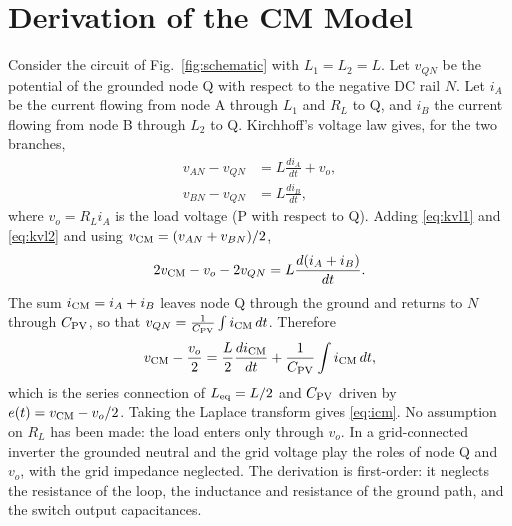 \section{Derivation of the CM Model}
\label{app:cm}
Consider the circuit of Fig.~\ref{fig:schematic} with $L_1=L_2=L$. Let $v_{QN}$ be the potential of the grounded node Q with respect to the negative DC rail $N$. Let $i_A$ be the current flowing from node A through $L_1$ and $R_L$ to Q, and $i_B$ the current flowing from node B through $L_2$ to Q. Kirchhoff's voltage law gives, for the two branches,
\begin{align}
v_{AN}-v_{QN}&=L\frac{di_A}{dt}+v_o, \label{eq:kvl1}\\
v_{BN}-v_{QN}&=L\frac{di_B}{dt}, \label{eq:kvl2}
\end{align}
where $v_o=R_Li_A$ is the load voltage (P with respect to Q). Adding \eqref{eq:kvl1} and \eqref{eq:kvl2} and using $v_{\mathrm{CM}}=(v_{AN}+v_{BN})/2$,
\begin{equation}
2v_{\mathrm{CM}}-v_o-2v_{QN}=L\frac{d(i_A+i_B)}{dt}.
\end{equation}
The sum $i_{\mathrm{CM}}=i_A+i_B$ leaves node Q through the ground and returns to $N$ through $C_{\mathrm{PV}}$, so that $v_{QN}=\frac{1}{C_{\mathrm{PV}}}\int i_{\mathrm{CM}}\,dt$. Therefore
\begin{equation}
v_{\mathrm{CM}}-\frac{v_o}{2}=\frac{L}{2}\frac{di_{\mathrm{CM}}}{dt}+\frac{1}{C_{\mathrm{PV}}}\int i_{\mathrm{CM}}\,dt,
\end{equation}
which is the series connection of $L_{\mathrm{eq}}=L/2$ and $C_{\mathrm{PV}}$ driven by $e(t)=v_{\mathrm{CM}}-v_o/2$. Taking the Laplace transform gives \eqref{eq:icm}. No assumption on $R_L$ has been made: the load enters only through $v_o$. In a grid-connected inverter the grounded neutral and the grid voltage play the roles of node Q and $v_o$, with the grid impedance neglected. The derivation is first-order: it neglects the resistance of the loop, the inductance and resistance of the ground path, and the switch output capacitances.
